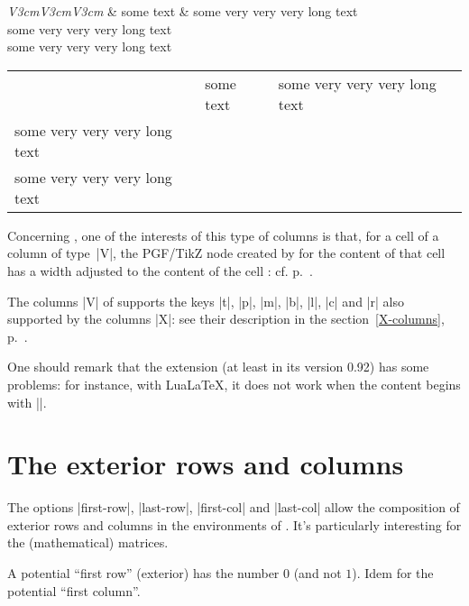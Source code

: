 \documentclass[dvipsnames]{article}%
\begin{document}
\medskip
\begin{Code}
\begin{NiceTabular}[corners=NW,hvlines]{\emph{V{3cm}V{3cm}V{3cm}}}
& some text & some very very very long text \\
some very very very long text \\
some very very very long text 
\end{NiceTabular}
\end{Code}

\medskip
\begin{center}
\begin{NiceTabular}[corners=NW,hvlines]{V{3cm}V{3cm}V{3cm}}
& some text & some very very very long text \\
some very very very long text \\
some very very very long text 
\end{NiceTabular}
\end{center}

\bigskip
Concerning , one of the
interests of this type of columns is that, for a cell of a column of type~|V|,
the PGF/TikZ node created by  for the content of that cell has
a width adjusted to the content of the cell : cf. p.~\pageref{node-V}. 


\bigskip
The columns |V| of  supports the keys |t|, |p|, |m|, |b|, |l|,
|c| and |r| also supported by the columns |X|: see their description in the
section~\ref{X-columns}, p.~\pageref{X-columns}.

\bigskip
One should remark that the extension  (at least in its version
0.92) has some problems: for instance, with LuaLaTeX, it does not work when
the content begins with |\color|.



\bigskip
\section{The exterior rows and columns}


The options |first-row|, |last-row|, |first-col| and |last-col| allow the
composition of exterior rows and columns in the environments of
. It's particularly interesting for the (mathematical)
matrices. 
\label{exterior}

A potential ``first row'' (exterior) has the number $0$ (and not $1$). Idem
for the potential ``first column''. 
\end{document}
